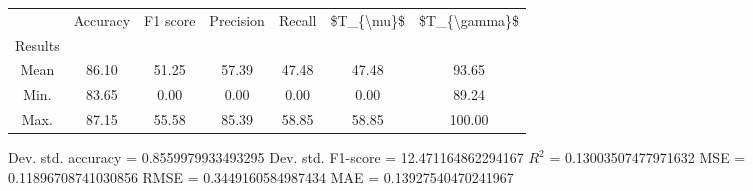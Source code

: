 \begin{tabular}{|c|c|c|c|c|c|c|}
\toprule
{} &  Accuracy &  F1 score &  Precision &  Recall &  \$T\_\{\textbackslash mu\}\$ &  \$T\_\{\textbackslash gamma\}\$ \\
Results &           &           &            &         &            &               \\
\hline
Mean    &     86.10 &     51.25 &      57.39 &   47.48 &      47.48 &         93.65 \\
Min.    &     83.65 &      0.00 &       0.00 &    0.00 &       0.00 &         89.24 \\
Max.    &     87.15 &     55.58 &      85.39 &   58.85 &      58.85 &        100.00 \\
\bottomrule
\end{tabular}

 Dev. std. accuracy = 0.8559979933493295
 Dev. std. F1-score = 12.471164862294167
 $R^2$ = 0.13003507477971632
 MSE = 0.11896708741030856
 RMSE = 0.3449160584987434
 MAE = 0.13927540470241967